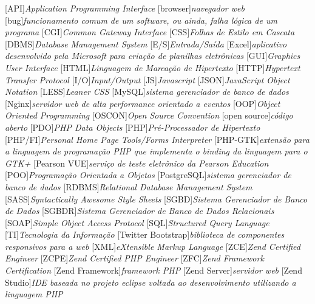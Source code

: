 
			[API]{\textit{Application Programming Interface}}
		[browser]{\textit{navegador web}}
			[bug]{\textit{funcionamento comum de um software, ou ainda, falha
lógica de um programa}}
			[CGI]{\textit{Common Gateway Interface }}
			[CSS]{\textit{Folhas de Estilo em Cascata}}
			[DBMS]{\textit{Database Management System}}
			[E/S]{\textit{Entrada/Saída}}
		[Excel]{\textit{aplicativo desenvolvido pela Microsoft para
criação de planilhas eletrônicas}}
			[GUI]{\textit{Graphics User Interface}}
			[HTML]{\textit{Linguagem de Marcação de Hipertexto}}
			[HTTP]{\textit{Hypertext Transfer Protocol}}
			[I/O]{\textit{Input/Output}}
			[JS]{\textit{Javascript}}
			[JSON]{\textit{JavaScript Object Notation}}
			[LESS]{\textit{Leaner CSS}}
		[MySQL]{\textit{sistema gerenciador de banco de dados}}
		[Nginx]{\textit{servidor web de alta performance orientado a
eventos}}
			[OOP]{\textit{Object Oriented Programming}}
		[OSCON]{\textit{Open Source Convention}}
	[open source]{\textit{código aberto}}
			[PDO]{\textit{‎PHP Data Objects}}
			[PHP]{\textit{Pré-Processador de Hipertexto}}
		[PHP/FI]{\textit{Personal Home Page Tools/Forms Interpreter}}
		[PHP-GTK]{\textit{extensão para a linguagem de programação PHP
que implementa o binding da linguagem para o GTK+}}
	[Pearson VUE]{\textit{serviço de teste eletrônico da Pearson Education}}
			[POO]{\textit{Programação Orientada a Objetos}}
	[PostgreSQL]{\textit{sistema gerenciador de banco de dados}}
		[RDBMS]{\textit{Relational Database Management System}}
			[SASS]{\textit{Syntactically Awesome Style Sheets}}
			[SGBD]{\textit{Sistema Gerenciador de Banco de Dados}}
			[SGBDR]{\textit{Sistema Gerenciador de Banco de Dados
Relacionais}}
			[SOAP]{\textit{Simple Object Access Protocol}}
			[SQL]{\textit{Structured Query Language}}
			[TI]{\textit{Tecnologia da Informação}}
[Twitter Bootstrap]{\textit{biblioteca de
componentes responsivos para a web}}
			[XML]{\textit{eXtensible Markup Language}}
			[ZCE]{\textit{Zend Certified Engineer}}
			[ZCPE]{\textit{Zend Certified PHP Engineer}}
			[ZFC]{\textit{Zend Framework Certification}}
[Zend Framework]{\textit{framework PHP}}
	[Zend Server]{\textit{servidor web}}
	[Zend Studio]{\textit{IDE baseada no projeto eclipse voltada
ao desenvolvimento utilizando a linguagem PHP}}
